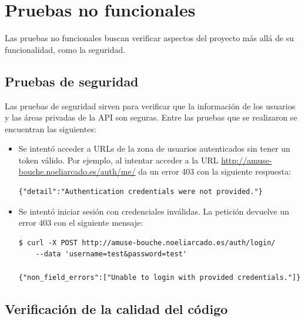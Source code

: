 \section{Pruebas no funcionales}

Las pruebas no funcionales buscan verificar aspectos del proyecto más allá de su
funcionalidad, como la seguridad.

\subsection{Pruebas de seguridad}

Las pruebas de seguridad sirven para verificar que la información de los
usuarios y las áreas privadas de la API son seguras. Entre las pruebas que se
realizaron se encuentran las siguientes:
\begin{itemize}
\item Se intentó acceder a URLs de la zona de usuarios autenticados sin tener
  un token válido. Por ejemplo, al intentar acceder a la URL
  \url{http://amuse-bouche.noeliarcado.es/auth/me/} da un error 403 con la
  siguiente respuesta:
  \begin{verbatim}
{"detail":"Authentication credentials were not provided."}
  \end{verbatim}

\item Se intentó iniciar sesión con credenciales inválidas. La petición devuelve
  un error 403 con el siguiente mensaje:
  \begin{verbatim}
$ curl -X POST http://amuse-bouche.noeliarcado.es/auth/login/
    --data 'username=test&password=test'

{"non_field_errors":["Unable to login with provided credentials."]}
  \end{verbatim}

  
\end{itemize}

\subsection{Verificación de la calidad del código}
